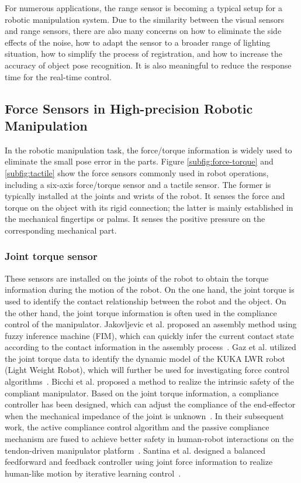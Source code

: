 \documentclass[journal,twoside,web]{ieeecolor}
\begin{document}
For numerous applications, the range sensor is becoming a typical setup for a robotic manipulation system. Due to the similarity between the visual sensors and range sensors, there are also many concerns on how to eliminate the side effects of the noise, how to adapt the sensor to a broader range of lighting situation, how to simplify the process of registration, and how to increase the accuracy of object pose recognition. It is also meaningful to reduce the response time for the real-time control.

\subsection{Force Sensors in High-precision Robotic Manipulation}
\label{subsec:force_sensor}

In the robotic manipulation task, the force/torque information is widely used to eliminate the small pose error in the parts. 
Figure \ref{subfig:force-torque} and \ref{subfig:tactile} show the force sensors commonly used in robot operations, including a six-axis force/torque sensor and a tactile sensor. 
The former is typically installed at the joints and wrists of the robot. It senses the force and torque on the object with its rigid connection; the latter is mainly established in the mechanical fingertips or palms. It senses the positive pressure on the corresponding mechanical part.

\subsubsection{Joint torque sensor}

These sensors are installed on the joints of the robot to obtain the torque information during the motion of the robot. 
On the one hand, the joint torque is used to identify the contact relationship between the robot and the object.
On the other hand, the joint torque information is often used in the compliance control of the manipulator. 
Jakovljevic et al. proposed an assembly method using fuzzy inference machine (FIM), which can quickly infer the current contact state according to the contact information in the assembly process~\cite{Jakovlijevic14}. 
Gaz et al. utilized the joint torque data to identify the dynamic model of the KUKA LWR robot (Light Weight Robot), which will further be used for investigating force control algorithms~\cite{Gaz2014}.
Bicchi et al. proposed a method to realize the intrinsic safety of the compliant manipulator. 
Based on the joint torque information, a compliance controller has been designed, which can adjust the compliance of the end-effector when the mechanical impedance of the joint is unknown~\cite{Bicchi2001}. 
In their subsequent work, the active compliance control algorithm and the passive compliance mechanism are fused to achieve better safety in human-robot interactions on the tendon-driven manipulator platform~\cite{Schiavi2009}. 
Santina et al. designed a balanced feedforward and feedback controller using joint force information to realize human-like motion by iterative learning control~\cite{Della2017}.
\end{document}
